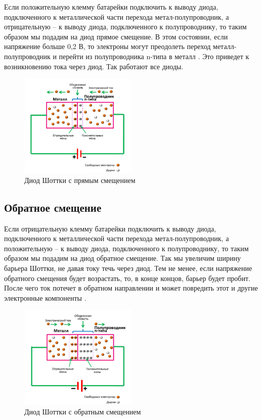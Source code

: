 \documentclass[spec, och, referat]{shiza}
\begin{document}
Если положительную клемму батарейки подключить к выводу диода, подключенного к металлической части перехода метал-полупроводник, а
отрицательную – к выводу диода, подключенного к полупроводнику, то таким образом мы подадим на диод прямое смещение. В этом состоянии, 
если напряжение больше 0,2 В, то электроны могут преодолеть переход металл-полупроводник и перейти из полупроводника n-типа в металл \cite{2}. 
Это приведет к возникновению тока через диод. Так работают все диоды.

\begin{figure}[H]
  \centering
  \includegraphics[width=0.5\textwidth]{photo/4.png}
  \caption{Диод Шоттки с прямым смещением}
\end{figure}

\subsection{Обратное смещение}

Если отрицательную клемму батарейки подключить к выводу диода, подключенного к металлической части перехода метал-полупроводник, 
а положительную – к выводу диода, подключенного к полупроводнику, то таким образом мы подадим на диод обратное смещение. Так мы 
увеличим ширину барьера Шоттки, не давая току течь через диод. Тем не менее, если напряжение обратного смещения будет возрастать, 
то, в конце концов, барьер будет пробит. После чего ток потечет в обратном направлении и может повредить этот и другие электронные компоненты \cite{2}.

\begin{figure}[H]
  \centering
  \includegraphics[width=0.5\textwidth]{photo/5.png}
  \caption{Диод Шоттки с обратным смещением}
\end{figure}
\end{document}
